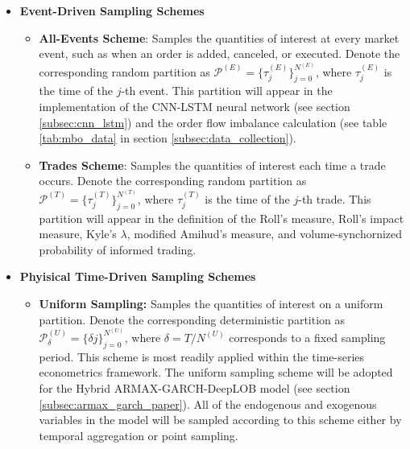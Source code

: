 \documentclass[10pt,a4paper,oneside]{article}
\begin{document}
\begin{itemize}
    \item \textbf{Event-Driven Sampling Schemes}
          \begin{itemize}
              \item \textbf{All-Events Scheme}: Samples the quantities of interest at every market event, such as when an order is added, canceled, or executed. Denote the corresponding random partition as $\mathcal{P}^{(E)} = \{\tau^{(E)}_j\}_{j=0}^{N^{(E)}}$, where $\tau^{(E)}_j$ is the time of the $j$-th event. This partition will appear in the implementation of the CNN-LSTM neural network (see section \ref{subsec:cnn_lstm}) and the order flow imbalance calculation (see table \ref{tab:mbo_data} in section \ref{subsec:data_collection}).
              \item \textbf{Trades Scheme}: Samples the quantities of interest each time a trade occurs. Denote the corresponding random partition as $\mathcal{P}^{(T)} = \{\tau^{(T)}_j\}_{j=0}^{N^{(T)}}$, where $\tau^{(T)}_j$ is the time of the $j$-th trade. This partition will appear in the definition of the Roll's measure, Roll's impact measure, Kyle's $\lambda$, modified  Amihud's measure, and volume-synchornized probability of informed trading.
          \end{itemize}
    \item \textbf{Phyisical Time-Driven Sampling Schemes}
          \begin{itemize}
              \item \textbf{Uniform Sampling:} Samples the quantities of interest on a uniform partition. Denote the corresponding deterministic partition as $\mathcal{P}^{(U)}_{\delta} = \{\delta j\}_{j=0}^{N^{(U)}}$, where $\delta = T / N^{(U)}$ corresponds to a fixed sampling period. This scheme is most readily applied within the time-series econometrics framework. The uniform sampling scheme will be adopted for the Hybrid ARMAX-GARCH-DeepLOB model (see section \ref{subsec:armax_garch_paper}). All of the endogenous and exogenous variables in the model will be sampled according to this scheme either by temporal aggregation or point sampling.
          \end{itemize}
\end{itemize}
\end{document}
